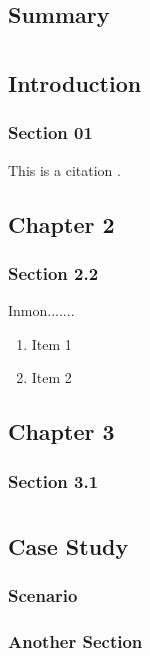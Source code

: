 \documentclass[a4paper, 12pt]{report}
\begin{document}


\tableofcontents

\chapter{Summary}

\lipsum

\newpage

\part{}
\chapter{Introduction}
\lipsum
\section{Section 01}
This is a citation \cite{grand}.

\chapter{Chapter 2}

\section{Section 2.2}
Inmon\cite{billinmonbdw}....... 
\begin{enumerate}
  \item Item 1
  \item Item 2
\end{enumerate}

\chapter{Chapter 3}
\section{Section 3.1}

\newpage
\part{}

\chapter{Case Study}
\section{Scenario}
\lipsum

\section{Another Section}



\newpage


\end{document}
